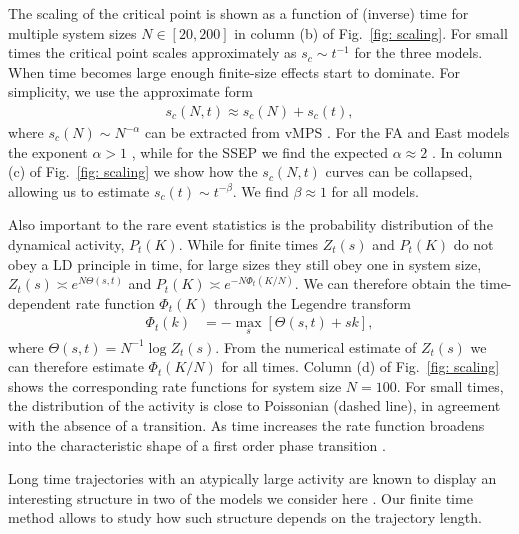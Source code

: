 \documentclass[prl,showpacs,superscriptaddress,twocolumn,longbibliography]{revtex4-1}
\begin{document}
The scaling of the critical point is shown as a function of (inverse) time for multiple system sizes $N\in[20, 200]$ in column (b) of Fig.~\ref{fig: scaling}. For small times the critical point scales approximately as $s_{c} \sim t^{-1}$ for the three models. When time becomes large enough finite-size effects start to dominate.
{For simplicity, we use the approximate form}
\begin{align}
    s_{c}(N, t) \approx s_{c}(N) + s_{c}(t) ,
\end{align}
where $s_{c}(N) \sim N^{-\alpha}$ can be extracted from {vMPS \cite{Banuls2019, Causer2020}}. For the FA and East models the exponent $\alpha > 1$ \cite{Banuls2019}, while for the SSEP we find the expected $\alpha \approx 2$ \cite{Appert-Rolland2008}. 
In column (c) of Fig.~\ref{fig: scaling} we show how the $s_{c}(N, t)$ curves can be collapsed, allowing us to estimate $s_{c}(t) \sim t^{-\beta}$. We find $\beta \approx 1$ for all models.


Also important to the rare event statistics is the probability distribution of the dynamical activity, $P_{t}(K)$. While for finite times
$Z_{t}(s)$ and $P_{t}(K)$ do not obey a LD principle in time, for large sizes they still obey one in system size, $Z_{t}(s) \asymp e^{N \Theta(s,t)}$ and $P_{t}(K) \asymp e^{- N \Phi_t(K/N)}$. We can therefore obtain the time-dependent rate function $\Phi_t(K)$ through the Legendre transform
\begin{align}
    \Phi_t(k) &= - \max_s
    \left[\Theta(s, t) + s k \right] , 
    \label{rate}
\end{align}
where $\Theta(s,t) = N^{-1} \log Z_{t}(s)$. From the numerical estimate of $Z_{t}(s)$ we can therefore estimate $\Phi_t(K/N)$ for all times. Column (d) of  Fig.~\ref{fig: scaling} shows the corresponding rate functions for system size $N = 100$. For small times, the distribution of the activity is close to Poissonian (dashed line), in agreement with the absence of a transition. As time increases the rate function broadens into the 
characteristic shape of a first order phase transition \cite{Garrahan2007, Banuls2019}.


\smallskip
{}
Long time trajectories with an atypically large activity are known to display an interesting structure in two of the models we consider here \cite{Jack2013, Jack2015, Banuls2019}. Our finite time method allows to study how such structure depends on the trajectory length. 
\end{document}
